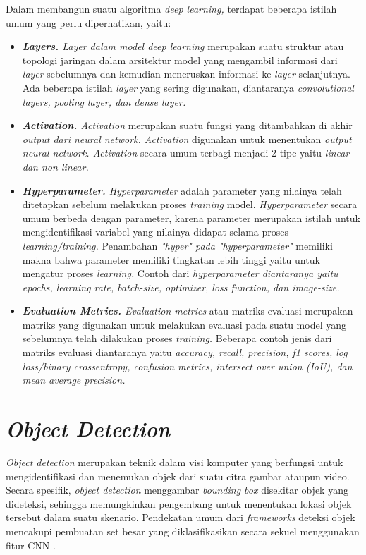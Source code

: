 Dalam membangun suatu algoritma \textit{deep learning,} terdapat beberapa istilah umum yang perlu diperhatikan, yaitu:
\begin{itemize}[nolistsep]
    \item \textit{\textbf{Layers.} Layer \textnormal{dalam model} deep learning} merupakan  suatu struktur atau topologi jaringan dalam arsitektur model yang mengambil informasi dari \textit{layer} sebelumnya dan kemudian meneruskan informasi ke \textit{layer} selanjutnya. Ada beberapa istilah \textit{layer} yang sering digunakan, diantaranya \textit{convolutional layers, pooling layer, \textnormal{dan} dense layer.}
    \item \textit{\textbf{Activation.} Activation} merupakan suatu fungsi yang ditambahkan di akhir \textit{output \textnormal{dari} neural network. Activation} digunakan untuk menentukan \textit{output neural network. Activation} secara umum terbagi menjadi 2 tipe yaitu \textit{linear \textnormal{dan} non linear.} 
    \item \textit{\textbf{Hyperparameter.} Hyperparameter} adalah parameter yang nilainya telah ditetapkan sebelum melakukan proses \textit{training} model. \textit{Hyperparameter} secara umum berbeda dengan parameter, karena parameter merupakan istilah untuk mengidentifikasi variabel yang nilainya didapat selama proses \textit{learning/training.} Penambahan \textit{"hyper" \textnormal{pada} "hyperparameter"} memiliki makna bahwa parameter memiliki tingkatan lebih tinggi yaitu untuk mengatur proses \textit{learning.} Contoh dari \textit{hyperparameter \textnormal{diantaranya yaitu} epochs, learning rate, batch-size, optimizer, loss function, \textnormal{dan} image-size.}
    \item \textit{\textbf{Evaluation Metrics.} Evaluation metrics} atau matriks evaluasi merupakan matriks yang digunakan untuk melakukan evaluasi pada suatu model yang sebelumnya telah dilakukan proses \textit{training.} Beberapa contoh jenis dari matriks evaluasi diantaranya yaitu \textit{accuracy, recall, precision, f1 scores, log loss/binary crossentropy, confusion metrics, intersect over union (IoU), \textnormal{dan} mean average precision.}
\end{itemize}

\section{\textit{Object Detection}}
\label{sec:objectdetection}
\textit{Object detection} merupakan teknik dalam visi komputer yang berfungsi untuk mengidentifikasi dan menemukan objek dari suatu citra gambar ataupun video. Secara spesifik, \textit{object detection} menggambar \textit{bounding box} disekitar objek yang dideteksi, sehingga memungkinkan pengembang untuk menentukan lokasi objek tersebut dalam suatu skenario. Pendekatan umum dari  \textit{frameworks} deteksi objek mencakupi pembuatan set besar yang diklasifikasikan secara sekuel menggunakan fitur CNN \citep*{voulodimos2018deep}. \par

